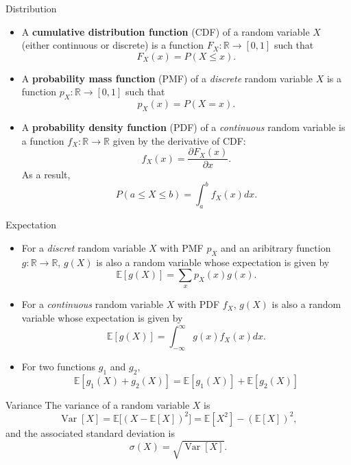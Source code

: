 \documentclass[10pt]{beamer}
\newcommand{\expect}{\mathbb{E}}
\newcommand{\var}{\operatorname{Var}}
\begin{document}
\begin{frame}{Distribution}
    \begin{itemize}
        \item A \textbf{cumulative distribution function} (CDF) of a random variable $X$ (either continuous or discrete) is a function $F_X: \mathbb{R} \to [0, 1]$ such that
        \[
            F_X(x) = P(X \le x).
        \]
        \item A \textbf{probability mass function} (PMF) of a \textit{discrete} random variable $X$ is a function $p_X: \mathbb{R} \to [0, 1]$ such that 
        \[
            p_X(x) = P(X = x).
        \]
        \item A \textbf{probability density function} (PDF) of a \textit{continuous} random variable is a function $f_X: \mathbb{R} \to \mathbb{R}$ given by the derivative of CDF:
        \[
            f_X(x) = \frac{\partial F_X(x)}{\partial x}. 
        \]
        As a result, 
        \[
            P(a \le X \le b) = \int_{a}^b f_X(x) dx.
        \]
    \end{itemize}
\end{frame}

\begin{frame}{Expectation}
    \begin{itemize}
    \item For a \textit{discret} random variable $X$ with PMF $p_X$ and an aribitrary function $g: \mathbb{R} \to \mathbb{R}$, $g(X)$ is also a random variable whose expectation is given by
    \[
        \expect[g(X)] = \sum_{x}p_X(x)g(x).
    \]
    \item For a \textit{continuous} random variable $X$ with PDF $f_X$, $g(X)$ is also a random variable whose expectation is given by
    \[
        \expect[g(X)] = \int_{-\infty}^\infty g(x)f_X(x)dx.
    \]
    \item For two functions $g_1$ and $g_2$, 
    \[
        \expect[g_1(X) + g_2(X)] = \expect[g_1(X)] + \expect[g_2(X)]
    \]
    \end{itemize}
\end{frame}

\begin{frame}{Variance}
    The variance of a random variable $X$ is 
    \[
        \var[X] = \expect\big[(X - \expect[X])^2\big] = \expect[X^2] - (\expect[X])^2, 
    \]
    and the associated standard deviation is 
    \[
        \sigma(X) = \sqrt{\var[X]}.
    \]
\end{frame}
\end{document}
